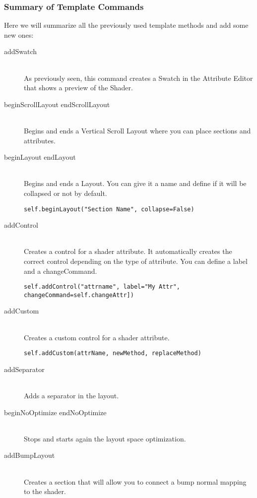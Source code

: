 \subsubsection{Summary of Template Commands}
Here we will summarize all the previously used template methods and add some new ones:

\begin{description}

\item[addSwatch] \hfill \\
As previously seen, this command creates a Swatch in the Attribute Editor that shows a preview of the Shader.

\item[beginScrollLayout endScrollLayout] \hfill \\
Begins and ends a Vertical Scroll Layout where you can place sections and attributes.

\item[beginLayout endLayout] \hfill \\
Begins and ends a Layout. You can give it a name and define if it will be collapsed or not by default.

\texttt{self.beginLayout("Section Name", collapse=False)}

\item[addControl] \hfill \\
Creates a control for a shader attribute. It automatically creates the correct control depending
on the type of attribute. You can define a label and a changeCommand.

\texttt{self.addControl("attrname", label="My Attr",}\\
\texttt{changeCommand=self.changeAttr])}

\item[addCustom] \hfill \\
Creates a custom control for a shader attribute.

\texttt{self.addCustom(attrName, newMethod, replaceMethod)}

\item[addSeparator] \hfill \\
Adds a separator in the layout.

\item[beginNoOptimize endNoOptimize] \hfill \\
Stops and starts again the layout space optimization.

\item[addBumpLayout] \hfill \\
Creates a section that will allow you to connect a bump normal mapping to the shader.


\end{description}
